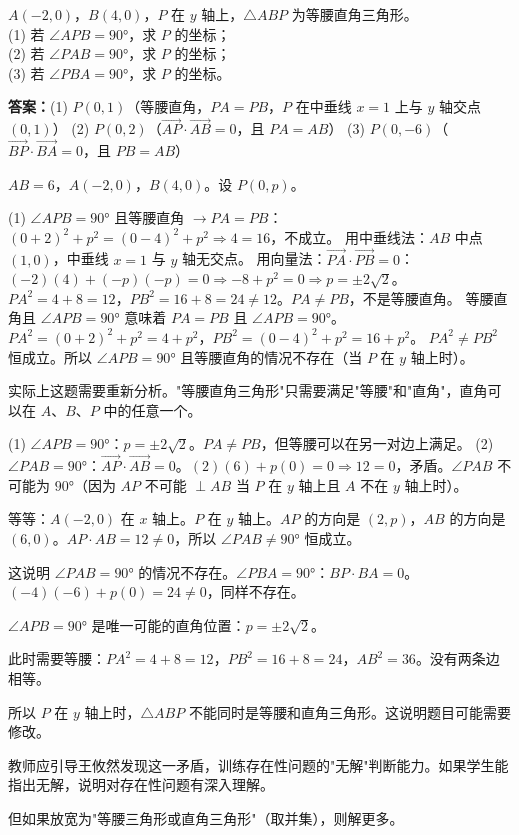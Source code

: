 \documentclass{exam-zh}
\newcommand{\answerarea}[1][40mm]{%
  \vspace{2mm}%
  \begin{tcolorbox}[
    enhanced, breakable,
    colback=white,
    colframe=white,
    boxrule=0pt,
    height=#1,
    valign=top,
    bottom=0mm,
    after skip=0mm,
  ]
  \end{tcolorbox}%
}
\newcounter{solstep}
\begin{document}
\begin{problem}[points=8]
  $A(-2, 0)$，$B(4, 0)$，$P$ 在 $y$ 轴上，$\triangle ABP$ 为等腰直角三角形。\\
(1) 若 $\angle APB = 90°$，求 $P$ 的坐标；\\
(2) 若 $\angle PAB = 90°$，求 $P$ 的坐标；\\
(3) 若 $\angle PBA = 90°$，求 $P$ 的坐标。

  \answerarea[80mm]
  \setcounter{solstep}{0}
  \begin{solutionblock}
    \textbf{答案：}(1) $P(0, 1)$（等腰直角，$PA = PB$，$P$ 在中垂线 $x = 1$ 上与 $y$ 轴交点 $(0, 1)$）
(2) $P(0, 2)$（$\overrightarrow{AP} \cdot \overrightarrow{AB} = 0$，且 $PA = AB$）
(3) $P(0, -6)$（$\overrightarrow{BP} \cdot \overrightarrow{BA} = 0$，且 $PB = AB$）
\par\medskip
    $AB = 6$，$A(-2, 0)$，$B(4, 0)$。设 $P(0, p)$。

(1) $\angle APB = 90°$ 且等腰直角 $\to PA = PB$：
$(0+2)^2 + p^2 = (0-4)^2 + p^2 \Rightarrow 4 = 16$，不成立。
用中垂线法：$AB$ 中点 $(1, 0)$，中垂线 $x = 1$ 与 $y$ 轴无交点。
用向量法：$\overrightarrow{PA} \cdot \overrightarrow{PB} = 0$：
$(-2)(4) + (-p)(-p) = 0 \Rightarrow -8 + p^2 = 0 \Rightarrow p = \pm 2\sqrt{2}$。
$PA^2 = 4 + 8 = 12$，$PB^2 = 16 + 8 = 24 \neq 12$。$PA \neq PB$，不是等腰直角。
等腰直角且 $\angle APB = 90°$ 意味着 $PA = PB$ 且 $\angle APB = 90°$。
$PA^2 = (0+2)^2 + p^2 = 4 + p^2$，$PB^2 = (0-4)^2 + p^2 = 16 + p^2$。
$PA^2 \neq PB^2$ 恒成立。所以 $\angle APB = 90°$ 且等腰直角的情况不存在（当 $P$ 在 $y$ 轴上时）。

实际上这题需要重新分析。"等腰直角三角形"只需要满足"等腰"和"直角"，直角可以在 $A$、$B$、$P$ 中的任意一个。

(1) $\angle APB = 90°$：$p = \pm 2\sqrt{2}$。$PA \neq PB$，但等腰可以在另一对边上满足。
(2) $\angle PAB = 90°$：$\overrightarrow{AP} \cdot \overrightarrow{AB} = 0$。$(2)(6) + p(0) = 0 \Rightarrow 12 = 0$，矛盾。$\angle PAB$ 不可能为 $90°$（因为 $AP$ 不可能 $\perp AB$ 当 $P$ 在 $y$ 轴上且 $A$ 不在 $y$ 轴上时）。

等等：$A(-2, 0)$ 在 $x$ 轴上。$P$ 在 $y$ 轴上。$AP$ 的方向是 $(2, p)$，$AB$ 的方向是 $(6, 0)$。$AP \cdot AB = 12 \neq 0$，所以 $\angle PAB \neq 90°$ 恒成立。

这说明 $\angle PAB = 90°$ 的情况不存在。$\angle PBA = 90°$：$BP \cdot BA = 0$。$(-4)(-6) + p(0) = 24 \neq 0$，同样不存在。

$\angle APB = 90°$ 是唯一可能的直角位置：$p = \pm 2\sqrt{2}$。

此时需要等腰：$PA^2 = 4 + 8 = 12$，$PB^2 = 16 + 8 = 24$，$AB^2 = 36$。没有两条边相等。

所以 $P$ 在 $y$ 轴上时，$\triangle ABP$ 不能同时是等腰和直角三角形。这说明题目可能需要修改。

教师应引导王攸然发现这一矛盾，训练存在性问题的"无解"判断能力。如果学生能指出无解，说明对存在性问题有深入理解。

但如果放宽为"等腰三角形或直角三角形"（取并集），则解更多。

  \end{solutionblock}
\end{problem}
\end{document}
